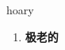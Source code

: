 
\begin{frame}
{\huge hoary}
\begin{center}
\begin{enumerate}\Large
  \item \textbf{极老的}
\end{enumerate}
\end{center}
\end{frame}
